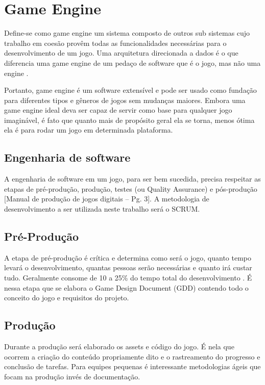 \documentclass[12pt, 
openright, 
oneside, 
a4paper,    
brazil]{facom-ufu-abntex2}
\begin{document}
\section{Game Engine}
Define-se como game engine um sistema composto de outros sub sistemas cujo trabalho em coesão provêm todas as funcionalidades necessárias para o desenvolvimento de um jogo. Uma arquitetura direcionada a dados é o que diferencia uma game engine de um pedaço de software que é o jogo, mas não uma engine \cite{GameEngineArchitecture}. 

Portanto, game engine é um software extensível e pode ser usado como fundação para diferentes tipos e gêneros de jogos sem mudanças maiores. Embora uma game engine ideal deva ser capaz de servir como base para qualquer jogo imaginável, é fato que quanto mais de propósito geral ela se torna, menos ótima ela é para rodar um jogo em determinada plataforma.


\iffalse
\subsection{Engenharia de software}
A engenharia de software em um jogo, para ser bem sucedida, precisa respeitar as etapas de pré-produção, produção, testes (ou Quality Assurance) e pós-produção [Manual de produção de jogos digitais – Pg. 3]. A metodologia de desenvolvimento a ser utilizada neste trabalho será o SCRUM.

\subsection{Pré-Produção}
A etapa de pré-produção é crítica e determina como será o jogo, quanto tempo levará o desenvolvimento, quantas pessoas serão necessárias e quanto irá custar tudo. Geralmente consome de 10 a 25\% do tempo total do desenvolvimento \cite{Manualdejogosdigitais}. É nessa etapa que se elabora o Game Design Document (GDD) contendo todo o conceito do jogo e requisitos do projeto.

\subsection{Produção}
Durante a produção será elaborado os assets e código do jogo. É nela que ocorrem a criação do conteúdo propriamente dito e o rastreamento do progresso e conclusão de tarefas\cite{Manualdejogosdigitais}. Para equipes pequenas é interessante metodologias ágeis que focam na produção invés de documentação.
\end{document}
